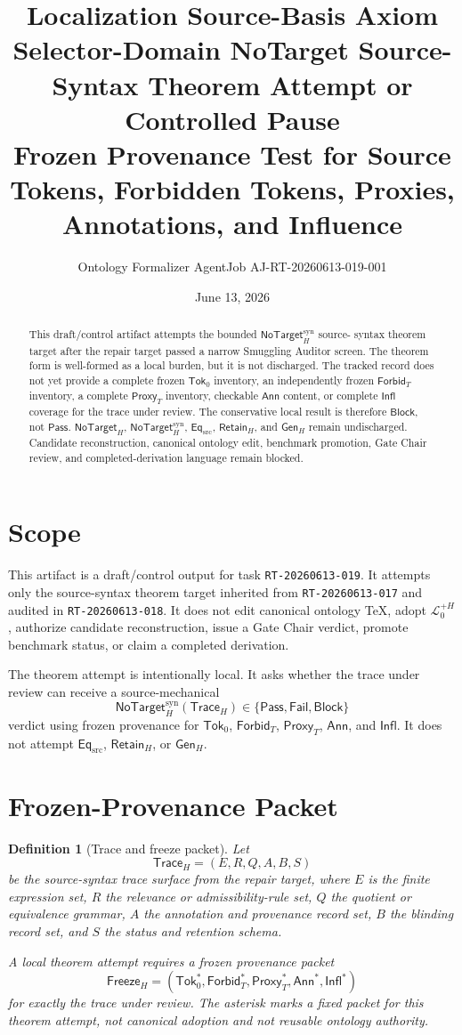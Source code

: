 \documentclass[11pt]{article}
\title{\textbf{Localization Source-Basis Axiom Selector-Domain NoTarget Source-Syntax Theorem Attempt or Controlled Pause}\\[0.35em]
\large Frozen Provenance Test for Source Tokens, Forbidden Tokens, Proxies, Annotations, and Influence}
\author{Ontology Formalizer AgentJob AJ-RT-20260613-019-001}
\date{June 13, 2026}
\newcommand{\LangPlus}{\mathcal{L}_{0}^{+H}}
\newcommand{\GenH}{\mathsf{Gen}_{H}}
\newcommand{\EqSrc}{\mathsf{Eq}_{\mathrm{src}}}
\newcommand{\RetainH}{\mathsf{Retain}_{H}}
\newcommand{\NoTargetH}{\mathsf{NoTarget}_{H}}
\newcommand{\NoTargetSyn}{\mathsf{NoTarget}_{H}^{\mathrm{syn}}}
\newcommand{\SrcTok}{\mathsf{Tok}_{0}}
\newcommand{\ForbidT}{\mathsf{Forbid}_{T}}
\newcommand{\ProxyT}{\mathsf{Proxy}_{T}}
\newcommand{\TraceH}{\mathsf{Trace}_{H}}
\newcommand{\Annot}{\mathsf{Ann}}
\newcommand{\Influence}{\mathsf{Infl}}
\newcommand{\FreezeH}{\mathsf{Freeze}_{H}}
\newcommand{\Pass}{\mathsf{Pass}}
\newcommand{\Fail}{\mathsf{Fail}}
\newcommand{\Block}{\mathsf{Block}}
\newtheorem{definitionblock}{Definition}
\begin{document}
\maketitle

\begin{abstract}
This draft/control artifact attempts the bounded \(\NoTargetSyn\) source-
syntax theorem target after the repair target passed a narrow Smuggling
Auditor screen. The theorem form is well-formed as a local burden, but it
is not discharged. The tracked record does not yet provide a complete frozen
\(\SrcTok\) inventory, an independently frozen \(\ForbidT\) inventory, a
complete \(\ProxyT\) inventory, checkable \(\Annot\) content, or complete
\(\Influence\) coverage for the trace under review. The conservative local
result is therefore \(\Block\), not \(\Pass\). \(\NoTargetH\),
\(\NoTargetSyn\), \(\EqSrc\), \(\RetainH\), and \(\GenH\) remain
undischarged. Candidate reconstruction, canonical ontology edit, benchmark
promotion, Gate Chair review, and completed-derivation language remain
blocked.
\end{abstract}

\section{Scope}

This artifact is a draft/control output for task \texttt{RT-20260613-019}.
It attempts only the source-syntax theorem target inherited from
\texttt{RT-20260613-017} and audited in \texttt{RT-20260613-018}. It does
not edit canonical ontology TeX, adopt \(\LangPlus\), authorize candidate
reconstruction, issue a Gate Chair verdict, promote benchmark status, or
claim a completed derivation.

The theorem attempt is intentionally local. It asks whether the trace under
review can receive a source-mechanical
\[
    \NoTargetSyn(\TraceH) \in \{\Pass,\Fail,\Block\}
\]
verdict using frozen provenance for \(\SrcTok\), \(\ForbidT\), \(\ProxyT\),
\(\Annot\), and \(\Influence\). It does not attempt \(\EqSrc\),
\(\RetainH\), or \(\GenH\).

\section{Frozen-Provenance Packet}

\begin{definitionblock}[Trace and freeze packet]
Let
\[
    \TraceH=(E,R,Q,A,B,S)
\]
be the source-syntax trace surface from the repair target, where \(E\) is
the finite expression set, \(R\) the relevance or admissibility-rule set,
\(Q\) the quotient or equivalence grammar, \(A\) the annotation and
provenance record set, \(B\) the blinding record set, and \(S\) the status
and retention schema.

A local theorem attempt requires a frozen provenance packet
\[
    \FreezeH =
    (\SrcTok^{*},\ForbidT^{*},\ProxyT^{*},\Annot^{*},\Influence^{*})
\]
for exactly the trace under review. The asterisk marks a fixed packet for
this theorem attempt, not canonical adoption and not reusable ontology
authority.
\end{definitionblock}
\end{document}
